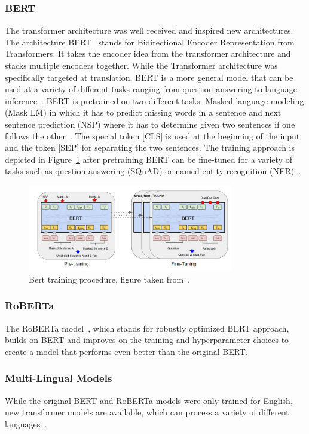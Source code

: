 \documentclass[acmsmall,nonacm]{acmart}
\begin{document}
\subsubsection{BERT}
The transformer architecture was well received and inspired new architectures. The architecture BERT~\cite{bert-devlin2019} stands for Bidirectional Encoder Representation from Transformers. It takes the encoder idea from the transformer architecture and stacks multiple encoders together. While the Transformer architecture was specifically targeted at translation, BERT is a more general model that can be used at a variety of different tasks ranging from question answering to language inference~\cite{bert-devlin2019}.  
BERT is pretrained on two different tasks. Masked language modeling (Mask LM) in which it has to predict missing words in a sentence and next sentence prediction (NSP) where it has to determine given two sentences if one follows the other~\cite{bert-devlin2019}. The special token [CLS] is used at the beginning of the input and the token [SEP] for separating the two sentences. The training approach is depicted in Figure~\ref{fig:bert} after pretraining BERT can be fine-tuned for a variety of tasks such as question answering (SQuAD) or named entity recognition (NER)~\cite{bert-devlin2019}. 

\begin{figure}
  \includegraphics[width=0.8\textwidth]{assets/bert_architecture.jpg}
  \caption{Bert training procedure, figure taken from~\cite{bert-devlin2019}.}
  \label{fig:bert}
\end{figure}

\subsubsection{RoBERTa}
The RoBERTa model~\cite{roberta-liu2019}, which stands for robustly optimized BERT approach, builds on BERT and improves on the training and hyperparameter choices to create a model that performs even better than the original BERT.

\subsubsection{Multi-Lingual Models}
While the original BERT and RoBERTa models were only trained for English, new transformer models are available, which can process a variety of different languages~\cite{xlm-roberta-conneau2020unsupervised}.
\end{document}
